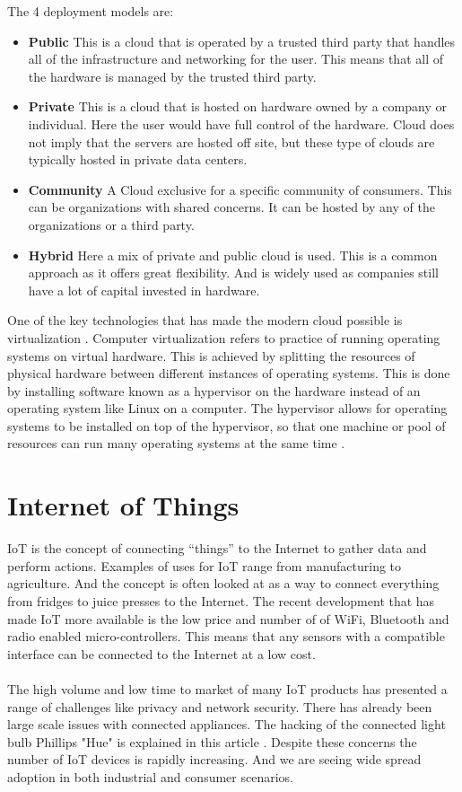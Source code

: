 \documentclass[]{uiophd}
\begin{document}
The 4 deployment models are:
\begin{itemize}
\item \textbf{Public} This is a cloud that is operated by a trusted third party that handles all of the infrastructure and networking for the user. This means that all of the hardware is managed by the trusted third party.
\item \textbf{Private} This is a cloud that is hosted on hardware owned by a company or individual. Here the user would have full control of the hardware. Cloud does not imply that the servers are hosted off site, but these type of clouds are typically hosted in private data centers.  
\item \textbf{Community} A Cloud exclusive for a specific community of consumers. This can be organizations with shared concerns. It can be hosted by any of the organizations or a third party. 
\item \textbf{Hybrid} Here a mix of private and public cloud is used. This is a common approach as it offers great flexibility. And is widely used as companies still have a lot of capital invested in hardware.
\end{itemize}
 
One of the key technologies that has made the modern cloud possible is virtualization \cite{virt}. Computer virtualization refers to practice of running operating systems on virtual hardware. This is achieved by splitting the resources of physical hardware between different instances of operating systems. This is done by installing software known as a hypervisor on the hardware instead of an operating system like Linux on a computer. The hypervisor allows for operating systems to be installed on top of the hypervisor, so that one machine or pool of resources can run many operating systems at the same time \cite{1430631}.


\section{Internet of Things}
IoT is the concept of connecting “things” to the Internet to gather data and perform actions. Examples of uses for IoT range from manufacturing to agriculture. And the concept is often looked at as a way to connect everything from fridges to juice presses to the Internet. The recent development that has made IoT more available is the low price and number of of WiFi, Bluetooth and radio enabled micro-controllers.  This means that any sensors with a compatible interface can be connected to the Internet at a low cost.
\\\\
The high volume and low time to market of many IoT products has presented a range of challenges like privacy and network security. There has already been large scale issues with connected appliances. The hacking of the connected light bulb Phillips "Hue" is explained in this article \cite{6997469}. Despite these concerns the number of IoT devices is rapidly increasing. And we are seeing wide spread adoption in both industrial and consumer scenarios. 
\end{document}
